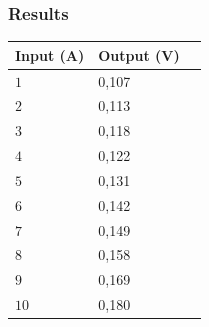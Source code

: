 \subsubsection{Results}
\begin{minipage}{\linewidth}
	\centering
	\begin{minipage}{0.3\linewidth}      
		\begin{table}[H]
\begin{tabular}{|l|l|l|}
\hline%
  \textbf{Input (A)}  & \textbf{Output (V)}  \\
\hline%
  $1$                 &            0,107    \\
\hline%
  $2$                 &            0,113    \\
\hline%
  $3$                 &            0,118    \\
\hline%
  $4$                 &            0,122    \\
\hline%
  $5$                 &            0,131    \\
\hline%
  $6$                 &            0,142    \\
\hline%
  $7$                 &            0,149    \\
\hline%
  $8$                 &            0,158    \\
\hline%
  $9$                 &            0,169    \\
\hline%
  $10$                &            0,180    \\
\hline%
\end{tabular}
\end{table}	\end{minipage}
	\hspace{0.03\linewidth}
	\begin{minipage}{0.6\linewidth}
		\begin{figure}[H]
  \centering
  {
}
\end{figure}
\end{minipage}
\end{minipage}
